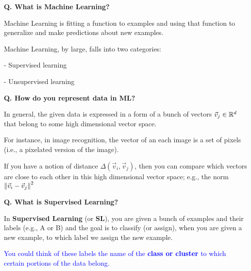 \begin{frame}[fragile]{\textbf{Q. What is Machine Learning?}}
  \begin{wideitemize}
    \item Machine Learning is fitting a function to examples and using
    that function to generalize and make predictions about
    new examples.
    \item Machine Learning, by large, falls into two categories:\vspace{.4em}
    \begin{wideitemize}
      \item[-] Supervised learning
      \item[-] Unsupervised learning
    \end{wideitemize}
  \end{wideitemize}
\end{frame}

\begin{frame}[fragile]{\textbf{Q. How do you represent data in ML?}}
  \begin{wideitemize}
    \item In general, the given data is expressed in a form of a bunch of vectors
    $\vec{v}_{j} \in {\Bbb R}^{d}$ that belong to some high dimensional vector space.
    \item For instance, in image recognition, the vector of an each image is
    a set of pixels (i.e., a pixelated version of the image).
    \item If you have a notion of distance $\Delta(\vec{v}_{i}, \vec{v}_{j})$,
    then you can compare which vectors are close to each other in this high
    dimensional vector space; e.g., the norm $\left\lVert \vec{v}_{i} - \vec{v}_{j} \right\rVert^2$
  \end{wideitemize}
\end{frame}

\begin{frame}[fragile]{\textbf{Q. What is Supervised Learning?}}
  \begin{wideitemize}
    \item In \textbf{Supervised Learning} (or \textbf{SL}), you are given a
    bunch of examples and their labels (e.g., A or B) and the goal is to
    classify (or assign), when you are given a new example, to which label we
    assign the new example.
    \item \textcolor{blue}{You could think of these labels the name of the
    \textbf{class or cluster} to which certain portions of the data belong.}
  \end{wideitemize}
\end{frame}

